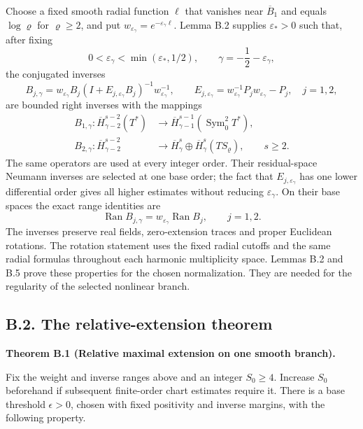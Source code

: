 \documentclass[
  english,
  11pt,
  reqno]{amsart}
\makeatletter
\newcommand{\paperdisplaynext}{%
  \let\paper@savedstartsection\@startsection
  \def\@startsection##1##2##3##4##5##6{%
    \let\@startsection\paper@savedstartsection
    \@tempskipa ##5\relax
    \ifdim\@tempskipa<\z@
      \def\paper@afterskip{.35\baselineskip}%
    \else
      \def\paper@afterskip{##5}%
    \fi
    \@startsection{##1}{##2}{##3}{##4}{\paper@afterskip}{##6}}}
\newcommand{\paperdisplaysection}{\paperdisplaynext\subsection}
\newcommand{\pandocstatementheading}[1]{%
  \par\if@nobreak\else
    \addpenalty{\@beginparpenalty}%
    \addvspace{.5\baselineskip plus .2\baselineskip minus .2\baselineskip}%
  \fi
  {\normalfont\bfseries #1\par}%
  \nobreak\@afterindenttrue\@afterheading
}
\let\paper@displaysection\paperdisplaysection
\renewcommand{\paperdisplaysection}[1]{%
  \let\paper@savedhangfrom\@hangfrom
  \long\def\@hangfrom##1##2{%
    \paper@savedhangfrom{##1}{\paper@headingparagraph##2}}%
  \paper@displaysection{#1}%
  \let\@hangfrom\paper@savedhangfrom}
\makeatother
\begin{document}
Choose a fixed smooth radial function \(\ell\) that vanishes near
\(\overline B_1\) and equals \(\log\varrho\) for \(\varrho\ge2\), and
put \(w_{\varepsilon_\gamma}=e^{-\varepsilon_\gamma\ell}\). Lemma B.2
supplies \(\varepsilon_*>0\) such that, after fixing%
 \[
0<\varepsilon_\gamma<\min(\varepsilon_*,1/2),
\qquad \gamma=-\frac12-\varepsilon_\gamma,
\] the conjugated inverses%
 \[
B_{j,\gamma}
=w_{\varepsilon_\gamma} B_j(I+E_{j,\varepsilon_\gamma}B_j)^{-1}w_{\varepsilon_\gamma}^{-1},
\qquad
E_{j,\varepsilon_\gamma}=w_{\varepsilon_\gamma}^{-1}P_jw_{\varepsilon_\gamma}-P_j,
\quad j=1,2,
\] are bounded right inverses with the mappings%
 \[
\begin{aligned}
B_{1,\gamma}:\overline H^{s-2}_{\gamma-2}(T^*)
&\longrightarrow
\overline H^{s-1}_{\gamma-1}(\operatorname{Sym}^2_0T^*),\\
B_{2,\gamma}:\overline H^{s-2}_{\gamma-2}
&\longrightarrow
\overline H^s_\gamma\oplus
\overline H^s_\gamma(TS_\varrho),
\qquad s\ge2.
\end{aligned}
\] The same operators are used at every integer order. Their
residual-space Neumann inverses are selected at one base order; the fact
that \(E_{j,\varepsilon_\gamma}\) has one lower differential order gives
all higher estimates without reducing \(\varepsilon_\gamma\). On their
base spaces the exact range identities are%
 \[
\operatorname{Ran}B_{j,\gamma}
=w_{\varepsilon_\gamma}\operatorname{Ran}B_j,
\qquad j=1,2.
\] The inverses preserve real fields, zero-extension traces and proper
Euclidean rotations. The rotation statement uses the fixed radial
cutoffs and the same radial formulas throughout each harmonic
multiplicity space. Lemmas B.2 and B.5 prove these properties for the
chosen normalization. They are needed for the regularity of the selected
nonlinear branch.

\paperdisplaysection{B.2. The relative-extension
theorem}\label{b.2.-the-relative-extension-theorem}\label{sec:online-extension-common-branch}

\pandocstatementheading{\leavevmode{}\label{thm:online-relative-extension-one-branch}Theorem B.1 (Relative maximal extension on one smooth branch).}

Fix the weight and inverse ranges above and an integer \(S_0\ge4\).
Increase \(S_0\) beforehand if subsequent finite-order chart estimates
require it. There is a base threshold \(\epsilon>0\), chosen with fixed
positivity and inverse margins, with the following property.
\end{document}

